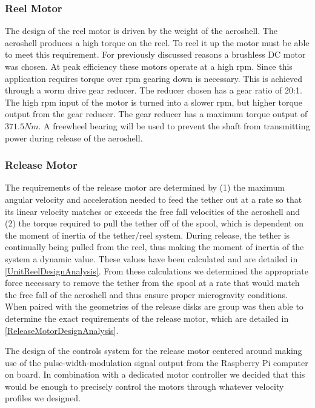 \subsubsection{Reel Motor}

\indent\indent The design of the reel motor is driven by the weight of the aeroshell. The aeroshell produces a high torque on the reel. To reel it up the motor must be able to meet this requirement. For previously discussed reasons a brushless DC motor was chosen. At peak efficiency these motors operate at a high rpm. Since this application requires torque over rpm gearing down is necessary. This is achieved through a worm drive gear reducer. The reducer chosen has a gear ratio of 20:1. The high rpm input of the motor is turned into a slower rpm, but higher torque output from the gear reducer. The gear reducer has a maximum torque output of $371.5 Nm$. A freewheel bearing will be used to prevent the shaft from transmitting power during release of the aeroshell.

\subsubsection{Release Motor}

\indent\indent The requirements of the release motor are determined by (1) the maximum angular velocity and acceleration needed to feed the tether out at a rate so that its linear velocity matches or exceeds the free fall velocities of the aeroshell and (2) the torque required to pull the tether off of the spool, which is dependent on the moment of inertia of the tether/reel system. During release, the tether is continually being pulled from the reel, thus making the moment of inertia of the system a dynamic value. These values have been calculated and are detailed in \ref{UnitReelDesignAnalysis}. From these calculations we determined the appropriate force necessary to remove the tether from the spool at a rate that would match the free fall of the aeroshell and thus ensure proper microgravity conditions. When paired with the geometries of the release disks are group was then able to determine the exact requirements of the release motor, which are detailed in \ref{ReleaseMotorDesignAnalysis}.

The design of the controls system for the release motor centered around making use of the pulse-width-modulation signal output from the Raspberry Pi computer on board. In combination with a dedicated motor controller we decided that this would be enough to precisely control the motors through whatever velocity profiles we designed. 

